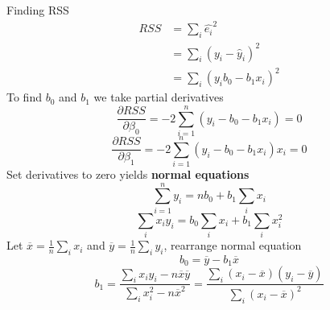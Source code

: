 \documentclass[11pt]{article}
\begin{document}
\begin{defn*}
    Finding RSS 
    \begin{align*}
        RSS &= \sum_{i} \hat{e_i}^2 \\
            &=\sum_{i} (y_i - \hat{y}_i)^2 \\
            &= \sum_{i} (y_i b_0 - b_1 x_i)^2
    \end{align*}
    To find $b_0$ and $b_1$ we take partial derivatives 
    \[
        \frac{\partial RSS}{\partial \beta_0} = -2\sum_{i=1}^n (y_i - b_0 - b_1 x_i) = 0
    \]
    \[
        \frac{\partial RSS}{\partial \beta_1} = -2\sum_{i=1}^n (y_i - b_0 - b_1 x_i)x_i = 0
    \]
    Set derivatives to zero yields \textbf{normal equations}
    \[
        \sum_{i=1}^n y_i = nb_0 + b_1 \sum_i x_i
    \]
    \[
        \sum_{i} x_i y_i = b_0 \sum_{i} x_i + b_1 \sum_i x_i^2
    \]
    Let $\overline{x} = \frac{1}{n} \sum_{i} x_i$  and $\overline{y} = \frac{1}{n} \sum_{i} y_i$, rearrange normal equation 
    \[
        b_0 = \overline{y} - b_1 \overline{x}
    \]
    \[
        b_1 = \frac{\sum_i x_i y_i - n \overline{x}\overline{y}}{\sum_i x_i^2 - n \overline{x}^2} = \frac{\sum_i (x_i - \overline{x})(y_i - \overline{y})}{\sum_i (x_i - \overline{x})^2}
    \]
\end{defn*}
\end{document}
